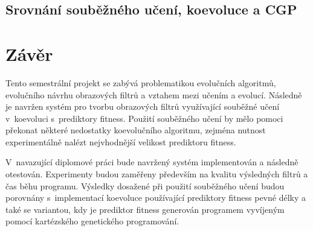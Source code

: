 \section{Srovnání souběžného učení, koevoluce a CGP}








\chapter{Závěr}
\label{chConclusions}

Tento semestrální projekt se zabývá problematikou evolučních algoritmů, evolučního návrhu obrazových filtrů a vztahem mezi učením a evolucí. Následně je navržen systém pro tvorbu obrazových filtrů využívající souběžné učení v~koevoluci s~prediktory fitness. Použití souběžného učení by mělo pomoci překonat některé nedostatky koevolučního algoritmu, zejména nutnost experimentálně nalézt nejvhodnější velikost prediktoru fitness.


V~navazující diplomové práci bude navržený systém implementován a následně otestován. Experimenty budou zaměřeny především na kvalitu výsledných filtrů a čas běhu programu. Výsledky dosažené při použití souběžného učení budou porovnány s~implementací koevoluce používající prediktory fitness pevné délky a také se variantou, kdy je prediktor fitness generován programem vyvíjeným pomocí kartézského genetického programování.
